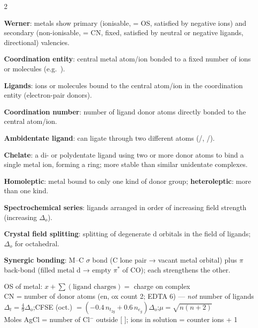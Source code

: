 \documentclass[10pt,a4paper]{extarticle}
\begin{document}
\begin{multicols}{2}
\begin{fl}
\item \textbf{Werner}: metals show primary (ionisable, = OS, satisfied by negative ions) and secondary (non-ionisable, = CN, fixed, satisfied by neutral or negative ligands, directional) valencies.
\item \textbf{Coordination entity}: central metal atom/ion bonded to a fixed number of ions or molecules (e.g.\ \ce{[CoCl3(NH3)3]}).
\item \textbf{Ligands}: ions or molecules bound to the central atom/ion in the coordination entity (electron-pair donors).
\item \textbf{Coordination number}: number of ligand donor atoms directly bonded to the central atom/ion.
\item \textbf{Ambidentate ligand}: can ligate through two different atoms (/, /).
\item \textbf{Chelate}: a di- or polydentate ligand using two or more donor atoms to bind a single metal ion, forming a ring; more stable than similar unidentate complexes.
\item \textbf{Homoleptic}: metal bound to only one kind of donor group; \textbf{heteroleptic}: more than one kind.
\item \textbf{Spectrochemical series}: ligands arranged in order of increasing field strength (increasing $\Delta_o$).
\item \textbf{Crystal field splitting}: splitting of degenerate d orbitals in the field of ligands; $\Delta_o$ for octahedral.
\item \textbf{Synergic bonding}: M--C $\sigma$ bond (C lone pair → vacant metal orbital) plus $\pi$ back-bond (filled metal d → empty $\pi^*$ of CO); each strengthens the other.
\end{fl}

\begin{kbox}
OS of metal: $x+\sum(\text{ligand charges})=$ charge on complex\\[1pt]
CN = number of donor atoms (en, ox count 2; EDTA 6) — \emph{not} number of ligands\\[1pt]
$\Delta_t=\tfrac49\Delta_o$;\quad CFSE (oct.) $=(-0.4\,n_{t_{2g}}+0.6\,n_{e_g})\Delta_o$;\quad $\mu=\sqrt{n(n+2)}$\\[1pt]
Moles AgCl = number of Cl$^-$ outside [ ]; ions in solution = counter ions + 1
\end{kbox}


\end{multicols}
\end{document}
